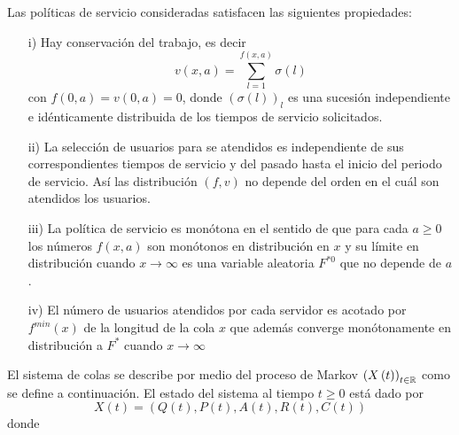 Las pol\'iticas de servicio consideradas satisfacen las siguientes
propiedades:

\begin{itemize}
\item[i)] Hay conservaci\'on del trabajo, es decir
\[v\left(x,a\right)=\sum_{l=1}^{f\left(x,a\right)}\sigma\left(l\right)\]
con $f\left(0,a\right)=v\left(0,a\right)=0$, donde
$\left(\sigma\left(l\right)\right)_{l}$ es una sucesi\'on
independiente e id\'enticamente distribuida de los tiempos de
servicio solicitados. \item[ii)] La selecci\'on de usuarios para se
atendidos es independiente de sus correspondientes tiempos de
servicio y del pasado hasta el inicio del periodo de servicio. As\'i
las distribuci\'on $\left(f,v\right)$ no depende del orden en el
cu\'al son atendidos los usuarios. \item[iii)] La pol\'itica de
servicio es mon\'otona en el sentido de que para cada $a\geq0$ los
n\'umeros $f\left(x,a\right)$ son mon\'otonos en distribuci\'on en $x$ y
su l\'imite en distribuci\'on cuando $x\rightarrow\infty$ es una
variable aleatoria $F^{*0}$ que no depende de $a$. \item[iv)] El
n\'umero de usuarios atendidos por cada servidor es acotado por
$f^{min}\left(x\right)$ de la longitud de la cola $x$ que adem\'as
converge mon\'otonamente en distribuci\'on a $F^{*}$ cuando
$x\rightarrow\infty$
\end{itemize}
El sistema de colas se describe por medio del proceso de Markov
$\left(X\left(t\right)\right)_{t\in\mathbb{R}}$ como se define a
continuaci\'on. El estado del sistema al tiempo $t\geq0$ est\'a dado
por
\[X\left(t\right)=\left(Q\left(t\right),P\left(t\right),A\left(t\right),R\left(t\right),C\left(t\right)\right)\]
donde
